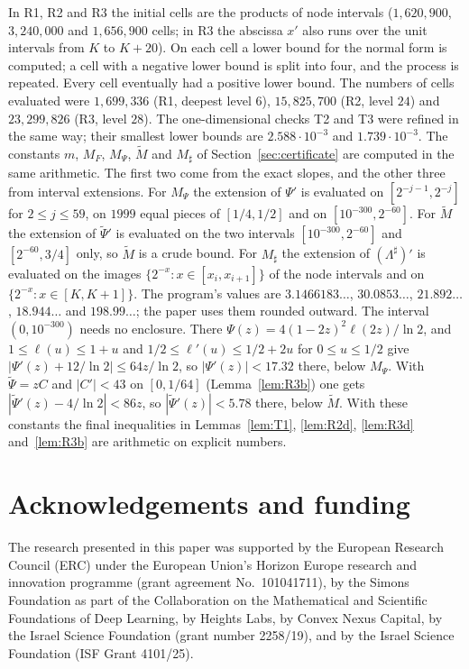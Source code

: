 \documentclass[11pt]{amsart}
\theoremstyle{remark}
\begin{document}
In R1, R2 and R3 the initial cells are the products of node intervals ($1{,}620{,}900$, $3{,}240{,}000$ and $1{,}656{,}900$ cells; in R3 the abscissa $x'$ also runs over the unit intervals from $K$ to $K+20$). On each cell a lower bound for the normal form is computed; a cell with a negative lower bound is split into four, and the process is repeated. Every cell eventually had a positive lower bound. The numbers of cells evaluated were $1{,}699{,}336$ (R1, deepest level $6$), $15{,}825{,}700$ (R2, level $24$) and $23{,}299{,}826$ (R3, level $28$). The one-dimensional checks T2 and T3 were refined in the same way; their smallest lower bounds are $2.588\cdot10^{-3}$ and $1.739\cdot10^{-3}$. The constants $m$, $M_F$, $M_\Psi$, $\widetilde M$ and $M_\sharp$ of Section~\ref{sec:certificate} are computed in the same arithmetic. The first two come from the exact slopes, and the other three from interval extensions. For $M_\Psi$ the extension of $\Psi'$ is evaluated on $[2^{-j-1},2^{-j}]$ for $2\le j\le59$, on $1999$ equal pieces of $[1/4,1/2]$ and on $[10^{-300},2^{-60}]$. For $\widetilde M$ the extension of $\widetilde\Psi'$ is evaluated on the two intervals $[10^{-300},2^{-60}]$ and $[2^{-60},3/4]$ only, so $\widetilde M$ is a crude bound. For $M_\sharp$ the extension of $(\Lambda^\sharp)'$ is evaluated on the images $\{2^{-x}:x\in[x_i,x_{i+1}]\}$ of the node intervals and on $\{2^{-x}:x\in[K,K+1]\}$. The program's values are $3.1466183\ldots$, $30.0853\ldots$, $21.892\ldots$, $18.944\ldots$ and $198.99\ldots$; the paper uses them rounded outward. The interval $(0,10^{-300})$ needs no enclosure. There $\Psi(z)=4(1-2z)^2\ell(2z)/\ln2$, and $1\le\ell(u)\le1+u$ and $1/2\le\ell'(u)\le1/2+2u$ for $0\le u\le1/2$ give $|\Psi'(z)+12/\ln2|\le64z/\ln2$, so $|\Psi'(z)|<17.32$ there, below $M_\Psi$. With $\widetilde\Psi=zC$ and $|C'|<43$ on $[0,1/64]$ (Lemma~\ref{lem:R3b}) one gets $|\widetilde\Psi'(z)-4/\ln2|<86z$, so $|\widetilde\Psi'(z)|<5.78$ there, below $\widetilde M$. With these constants the final inequalities in Lemmas~\ref{lem:T1}, \ref{lem:R2d}, \ref{lem:R3d} and~\ref{lem:R3b} are arithmetic on explicit numbers.

\section*{Acknowledgements and funding}
The research presented in this paper was supported by the European Research Council (ERC) under the European Union's Horizon Europe research and innovation programme (grant agreement No.~101041711), by the Simons Foundation as part of the Collaboration on the Mathematical and Scientific Foundations of Deep Learning, by Heights Labs, by Convex Nexus Capital, by the Israel Science Foundation (grant number 2258/19), and by the Israel Science Foundation (ISF Grant 4101/25).
\end{document}
